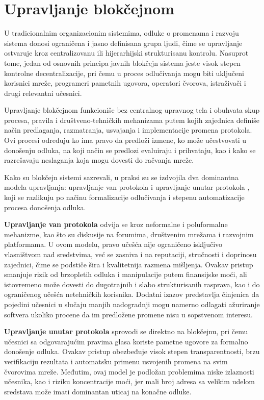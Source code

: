 \section{Upravljanje blokčejnom}
U tradicionalnim organizacionim sistemima, odluke o promenama i razvoju sistema donosi ograničena i jasno definisana grupa ljudi, čime se upravljanje ostvaruje kroz centralizovanu ili hijerarhijski strukturisanu kontrolu. Nasuprot tome, jedan od osnovnih principa javnih blokčejn sistema jeste visok stepen kontrolne decentralizacije, pri čemu u proces odlučivanja mogu biti uključeni korisnici mreže, programeri pametnih ugovora, operatori čvorova, istraživači i drugi relevantni učesnici.

Upravljanje blokčejnom \cite{liu2023systematic}  funkcioniše bez centralnog upravnog tela i obuhvata skup procesa, pravila i društveno-tehničkih mehanizama putem kojih zajednica definiše način predlaganja, razmatranja, usvajanja i implementacije promena protokola. Ovi procesi određuju ko ima pravo da predloži izmene, ko može učestvovati u donošenju odluka, na koji način se predlozi evaluiraju i prihvataju, kao i kako se razrešavaju neslaganja koja mogu dovesti do račvanja mreže.

Kako su blokčejn sistemi sazrevali, u praksi su se izdvojila dva dominantna modela upravljanja: upravljanje van protokola  i upravljanje unutar protokola , koji se razlikuju po načinu formalizacije odlučivanja i stepenu automatizacije procesa donošenja odluka.

\begin{description}
\item \textbf{Upravljanje van protokola} odvija se kroz neformalne i poluformalne mehanizme, kao što su diskusije na forumima, društvenim mrežama i razvojnim platformama. U ovom modelu, pravo učešća nije ograničeno isključivo vlasništvom nad sredstvima, već se zasniva i na reputaciji, stručnosti i doprinosu zajednici, čime se podstiče šira i kvalitetnija razmena mišljenja. Ovakav pristup smanjuje rizik od brzopletih odluka i manipulacije putem finansijske moći, ali istovremeno može dovesti do dugotrajnih i slabo strukturisanih rasprava, kao i do ograničenog učešća netehničkih korisnika. Dodatni izazov predstavlja činjenica da pojedini učesnici u slučaju manjih nadogradnji mogu namerno odlagati ažuriranje softvera ukoliko procene da im predložene promene nisu u sopstvenom interesu.

\item \textbf{Upravljanje unutar protokola} sprovodi se direktno na blokčejnu, pri čemu učesnici sa odgovarajućim pravima glasa koriste pametne ugovore za formalno donošenje odluka. Ovakav pristup obezbeđuje visok stepen transparentnosti, brzu verifikaciju rezultata i automatsku primenu usvojenih promena na svim čvorovima mreže. Međutim, ovaj model je podložan problemima niske izlaznosti učesnika, kao i riziku koncentracije moći, jer mali broj adresa sa velikim udelom sredstava može imati dominantan uticaj na konačne odluke.
\end{description}

